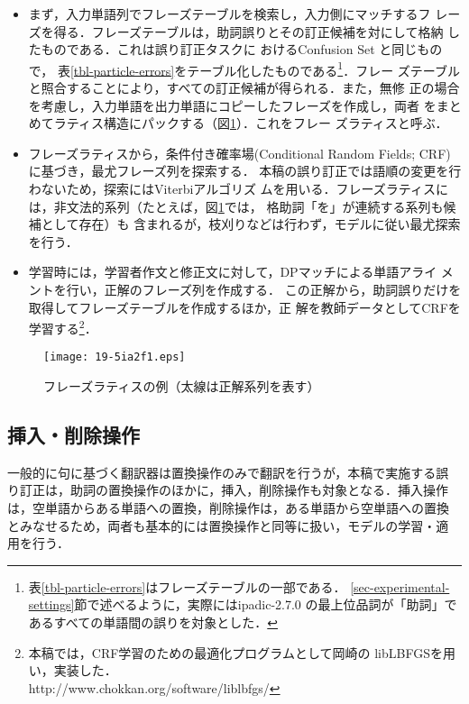 \documentclass[japanese]{jnlp_1.4}
\begin{document}
\begin{itemize}
\item まず，入力単語列でフレーズテーブルを検索し，入力側にマッチするフ
レーズを得る．フレーズテーブルは，助詞誤りとその訂正候補を対にして格納
したものである．これは誤り訂正タスクに
おけるConfusion Set と同じもので，
表\ref{tbl-particle-errors}をテーブル化したものである\footnote{
	表\ref{tbl-particle-errors}はフレーズテーブルの一部である．
\ref{sec-experimental-settings}節で述べるように，実際にはipadic-2.7.0
の最上位品詞が「助詞」であるすべての単語間の誤りを対象とした．}．フレー
ズテーブルと照合することにより，すべての訂正候補が得られる．また，無修
正の場合を考慮し，入力単語を出力単語にコピーしたフレーズを作成し，両者
をまとめてラティス構造にパックする（図\ref{fig-lattice}）．これをフレー
ズラティスと呼ぶ．

\item フレーズラティスから，条件付き確率場(Conditional Random Fields;
CRF) に基づき，最尤フレーズ列を探索する．
本稿の誤り訂正では語順の変更を行わないため，探索にはViterbiアルゴリズ
ムを用いる．フレーズラティスには，非文法的系列（たとえば，図\ref{fig-lattice}では，
格助詞「を」が連続する系列も候補として存在）も
含まれるが，枝刈りなどは行わず，モデルに従い最尤探索を行う．

\item 学習時には，学習者作文と修正文に対して，DPマッチによる単語アライ
メントを行い，正解のフレーズ列を作成する．
この正解から，助詞誤りだけを取得してフレーズテーブルを作成するほか，正
解を教師データとしてCRFを学習する\footnote{
	本稿では，CRF学習のための最適化プログラムとして岡崎の
libLBFGSを用い，実装した．\\
http://www.chokkan.org/software/liblbfgs/}．
\end{itemize}

\begin{figure}[t]
\begin{center}
\texttt{[image: 19-5ia2f1.eps]}
\end{center}
\caption{フレーズラティスの例（太線は正解系列を表す）}
\label{fig-lattice}
\end{figure}



\subsection{挿入・削除操作}

一般的に句に基づく翻訳器は置換操作のみで翻訳を行うが，本稿で実施する誤
り訂正は，助詞の置換操作のほかに，挿入，削除操作も対象となる．挿入操作
は，空単語からある単語への置換，削除操作は，ある単語から空単語への置換
とみなせるため，両者も基本的には置換操作と同等に扱い，モデルの学習・適
用を行う．
\end{document}
